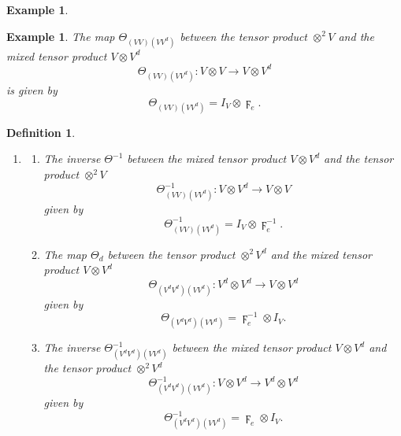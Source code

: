 \documentclass[aps,preprint]{revtex4}%
\newtheorem{definition}[theorem]{Definition}
\newtheorem{example}[theorem]{Example}
\begin{document}
\begin{example}
\begin{enumerate}
\end{enumerate}
\end{example}

\begin{example}
The map $\Theta_{\left(  VV\right)  \left(  VV^{d}\right)  }$ between the
tensor product $\otimes^{2}V$ and the mixed tensor product $V\otimes V^{d}$%
\begin{equation}
\Theta_{\left(  VV\right)  \left(  VV^{d}\right)  }:V\otimes V\rightarrow
V\otimes V^{d}%
\end{equation}
is given by
\begin{equation}
\Theta_{\left(  VV\right)  \left(  VV^{d}\right)  }=I_{V}\otimes\digamma_{e}.
\end{equation}

\end{example}

\begin{definition}
\begin{enumerate}
\item
\begin{enumerate}
\item The inverse $\Theta^{-1}$ between the mixed tensor product $V\otimes
V^{d}$ and the tensor product $\otimes^{2}V$
\begin{equation}
\Theta_{\left(  VV\right)  \left(  VV^{d}\right)  }^{-1}:V\otimes
V^{d}\rightarrow V\otimes V
\end{equation}
given by
\begin{equation}
\Theta_{\left(  VV\right)  \left(  VV^{d}\right)  }^{-1}=I_{V}\otimes
\digamma_{e}^{-1}.
\end{equation}


\item The map $\Theta_{d}$ between the tensor product $\otimes^{2}V^{d}$ and
the mixed tensor product $V\otimes V^{d}$%
\begin{equation}
\Theta_{\left(  V^{d}V^{d}\right)  \left(  VV^{d}\right)  }:V^{d}\otimes
V^{d}\rightarrow V\otimes V^{d}%
\end{equation}
given by
\begin{equation}
\Theta_{\left(  V^{d}V^{d}\right)  \left(  VV^{d}\right)  }=\digamma_{e}%
^{-1}\otimes I_{V}.
\end{equation}


\item The inverse $\Theta_{\left(  V^{d}V^{d}\right)  \left(  VV^{d}\right)
}^{-1}$ between the mixed tensor product $V\otimes V^{d}$ and the tensor
product $\otimes^{2}V^{d}$
\begin{equation}
\Theta_{\left(  V^{d}V^{d}\right)  \left(  VV^{d}\right)  }^{-1}:V\otimes
V^{d}\rightarrow V^{d}\otimes V^{d}%
\end{equation}
given by
\begin{equation}
\Theta_{\left(  V^{d}V^{d}\right)  \left(  VV^{d}\right)  }^{-1}=\digamma
_{e}\otimes I_{V}.
\end{equation}

\end{enumerate}
\end{enumerate}
\end{definition}
\end{document}
